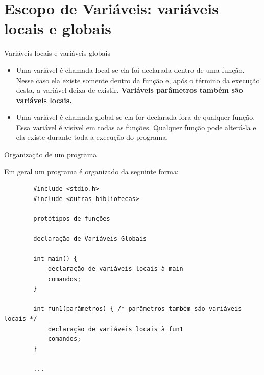 \documentclass[handout]{beamer}
\begin{document}
\section{Escopo de Variáveis: variáveis locais e globais}

\begin{frame}{Variáveis locais e variáveis globais}

    \begin{itemize}[<+->]
        \item Uma variável é chamada \alert{local} se ela foi declarada dentro de uma função.
        Nesse caso ela existe somente dentro da função e, após o término da execução desta, a variável deixa de existir.
        {\bf Variáveis parâmetros também são variáveis locais.}
        \item Uma variável é chamada \alert{global} se ela for declarada fora de qualquer função.
        Essa variável é visível em todas as funções.
        Qualquer função pode alterá-la e ela existe durante toda a execução do programa.
    \end{itemize}
\end{frame}

\begin{frame}[fragile]{Organização de um programa}

    Em geral um programa é organizado da seguinte forma:

    \begin{verbatim}
        #include <stdio.h>
        #include <outras bibliotecas>

        protótipos de funções
        
        declaração de Variáveis Globais

        int main() {
            declaração de variáveis locais à main
            comandos;
        }

        int fun1(parâmetros) { /* parâmetros também são variáveis locais */
            declaração de variáveis locais à fun1
            comandos;
        }

        ...
    \end{verbatim}
\end{frame}
\end{document}
